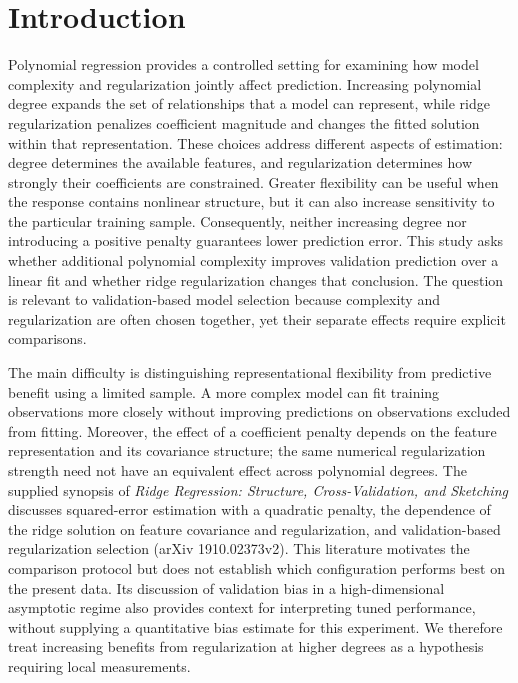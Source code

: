 \documentclass[11pt]{article}
\begin{document}
\section{Introduction}
Polynomial regression provides a controlled setting for examining how model complexity and regularization jointly affect prediction. Increasing polynomial degree expands the set of relationships that a model can represent, while ridge regularization penalizes coefficient magnitude and changes the fitted solution within that representation. These choices address different aspects of estimation: degree determines the available features, and regularization determines how strongly their coefficients are constrained. Greater flexibility can be useful when the response contains nonlinear structure, but it can also increase sensitivity to the particular training sample. Consequently, neither increasing degree nor introducing a positive penalty guarantees lower prediction error. This study asks whether additional polynomial complexity improves validation prediction over a linear fit and whether ridge regularization changes that conclusion. The question is relevant to validation-based model selection because complexity and regularization are often chosen together, yet their separate effects require explicit comparisons.

The main difficulty is distinguishing representational flexibility from predictive benefit using a limited sample. A more complex model can fit training observations more closely without improving predictions on observations excluded from fitting. Moreover, the effect of a coefficient penalty depends on the feature representation and its covariance structure; the same numerical regularization strength need not have an equivalent effect across polynomial degrees. The supplied synopsis of \emph{Ridge Regression: Structure, Cross-Validation, and Sketching} discusses squared-error estimation with a quadratic penalty, the dependence of the ridge solution on feature covariance and regularization, and validation-based regularization selection (arXiv 1910.02373v2). This literature motivates the comparison protocol but does not establish which configuration performs best on the present data. Its discussion of validation bias in a high-dimensional asymptotic regime also provides context for interpreting tuned performance, without supplying a quantitative bias estimate for this experiment. We therefore treat increasing benefits from regularization at higher degrees as a hypothesis requiring local measurements.
\end{document}
